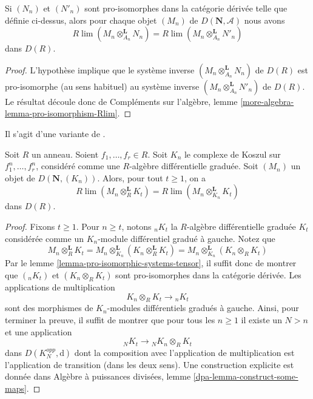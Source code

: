 \begin{lemma}
\label{lemma-pro-isomorphic-systems-tensor}
Si $(N_n)$ et $(N'_n)$ sont pro-isomorphes dans la catégorie dérivée telle que définie ci-dessus, alors pour chaque objet $(M_n)$ de $D(\mathbf{N}, \mathcal{A})$ nous avons
$$
R\lim (M_n \otimes_{A_n}^\mathbf{L} N_n) =
R\lim (M_n \otimes_{A_n}^\mathbf{L} N'_n)
$$
dans $D(R)$.
\end{lemma}

\begin{proof}
L'hypothèse implique que le système inverse $(M_n \otimes_{A_n}^\mathbf{L} N_n)$ de $D(R)$ est pro-isomorphe (au sens habituel) au système inverse $(M_n \otimes_{A_n}^\mathbf{L} N'_n)$ de $D(R)$.
Le résultat découle donc de Compléments sur l'algèbre, lemme \ref{more-algebra-lemma-pro-isomorphism-Rlim}.
\end{proof}

\begin{lemma}
\label{lemma-different-tensors}
\begin{reference}
Il s'agit d'une variante de \cite[Lemma 3.5.4]{BS}.
\end{reference}
Soit $R$ un anneau.
Soient $f_1, \ldots, f_r \in R$.
Soit $K_n$ le complexe de Koszul sur $f_1^n, \ldots, f_r^n$, considéré comme une $R$-algèbre différentielle graduée.
Soit $(M_n)$ un objet de $D(\mathbf{N}, (K_n))$. Alors, pour tout $t \geq 1$, on a
$$
R\lim (M_n \otimes_R^\mathbf{L} K_t) =
R\lim (M_n \otimes_{K_n}^\mathbf{L} K_t)
$$
dans $D(R)$.
\end{lemma}

\begin{proof}
Fixons $t \geq 1$.
Pour $n \geq t$, notons ${}_nK_t$ la $R$-algèbre différentielle graduée $K_t$ considérée comme un $K_n$-module différentiel gradué à gauche.
Notez que
$$
M_n \otimes_R^\mathbf{L} K_t =
M_n \otimes_{K_n}^\mathbf{L} (K_n \otimes_R^\mathbf{L} K_t) =
M_n \otimes_{K_n}^\mathbf{L} (K_n \otimes_R K_t)
$$
Par le lemme \ref{lemma-pro-isomorphic-systems-tensor}, il suffit donc de montrer que $({}_nK_t)$ et $(K_n \otimes_R K_t)$ sont pro-isomorphes dans la catégorie dérivée.
Les applications de multiplication
$$
K_n \otimes_R K_t \longrightarrow {}_nK_t
$$
sont des morphismes de $K_n$-modules différentiels gradués à gauche.
Ainsi, pour terminer la preuve, il suffit de montrer que pour tous les $n \geq 1$ il existe un $N > n$ et une application
$$
{}_NK_t \longrightarrow {}_NK_n \otimes_R K_t
$$
dans $D(K_N^{opp}, \text{d})$ dont la composition avec l'application de multiplication est l'application de transition (dans les deux sens).
Une construction explicite est donnée dans Algèbre à puissances divisées, lemme \ref{dpa-lemma-construct-some-maps}.
\end{proof}

